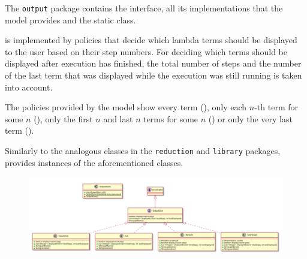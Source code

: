 The \texttt{output} package contains the \texttt{} interface, all
its implementations that the model provides and the \texttt{} static
class.

\texttt{} is implemented by policies that decide which lambda terms should be
displayed to the user based on their step numbers. For deciding which terms should
be displayed after execution has finished, the total number of steps and the number of
the last term that was displayed while the execution was still running is taken into
account.

The policies provided by the model show every term (\texttt{}), only each
$n$-th term for some $n$ (\texttt{}), only the first $n$ and last $n$ terms
for some $n$ (\texttt{}) or only the very last term (\texttt{}).

Similarly to the analogous classes in the \texttt{reduction} and \texttt{library} packages,
\texttt{} provides instances of the aforementioned classes.

\begin{figure}[H]
	\centering
	\includegraphics[width=\textwidth]{packageDiagrams/modelOutputPackage}
\end{figure}
